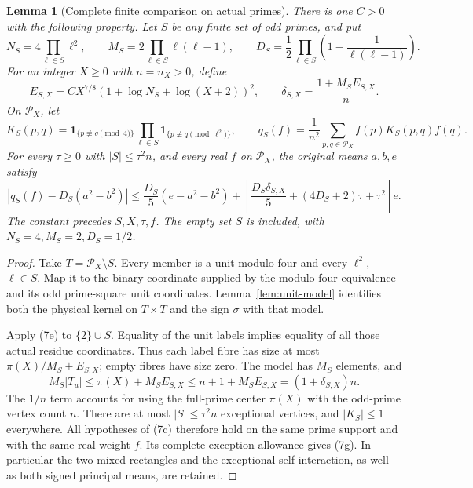 \documentclass[11pt]{article}
\newtheorem{lemma}{Lemma}
\newcommand{\Pcal}{\mathcal P}
\begin{document}
\begin{lemma}[Complete finite comparison on actual primes]\label{lem:prime-finite}
There is one \(C>0\) with the following property.
Let \(S\) be any finite set of odd primes, and put
\[
 N_S=4\prod_{\ell\in S}\ell^2,\qquad
 M_S=2\prod_{\ell\in S}\ell(\ell-1),\qquad
 D_S=\frac12\prod_{\ell\in S}
       \left(1-\frac1{\ell(\ell-1)}\right).
\]
For an integer \(X\ge0\) with \(n=n_X>0\), define
\[
 E_{S,X}=CX^{7/8}(1+\log N_S+\log(X+2))^2,\qquad
 \delta_{S,X}=\frac{1+M_SE_{S,X}}n .
\]
On \(\Pcal_X\), let
\[
 K_S(p,q)=\mathbf1_{\{p\not\equiv q\pmod4\}}
     \prod_{\ell\in S}\mathbf1_{\{p\not\equiv q\pmod{\ell^2}\}},\qquad
 q_S(f)=\frac1{n^2}\sum_{p,q\in\Pcal_X}f(p)K_S(p,q)f(q).
\]
For every \(\tau\ge0\) with \(|S|\le\tau^2n\), and every real
\(f\) on \(\Pcal_X\), the original means \(a,b,e\) satisfy
\[
 |q_S(f)-D_S(a^2-b^2)|
 \le\frac{D_S}{5}(e-a^2-b^2)
  +\left[\frac{D_S\delta_{S,X}}5+
           (4D_S+2)\tau+\tau^2\right]e.                    \tag{7g}
\]
The constant precedes \(S,X,\tau,f\).
The empty set \(S\) is included, with \(N_S=4,M_S=2,D_S=1/2\).
\end{lemma}
\begin{proof}
Take \(T=\Pcal_X\setminus S\).
Every member is a unit modulo four and every \(\ell^2\), \(\ell\in S\).
Map it to the binary coordinate supplied by the modulo-four equivalence
and its odd prime-square unit coordinates.
Lemma~\ref{lem:unit-model} identifies both the physical kernel on
\(T\times T\) and the sign \(\sigma\) with that model.

Apply (7e) to \(\{2\}\cup S\).
Equality of the unit labels implies equality of all those actual residue
coordinates. Thus each label fibre has size at most
\(\pi(X)/M_S+E_{S,X}\); empty fibres have size zero.
The model has \(M_S\) elements, and
\[
 M_S|T_u|\le\pi(X)+M_SE_{S,X}
 \le n+1+M_SE_{S,X}=(1+\delta_{S,X})n .
\]
The \(1/n\) term accounts for using the full-prime center \(\pi(X)\)
with the odd-prime vertex count \(n\).
There are at most \(|S|\le\tau^2n\) exceptional vertices, and
\(|K_S|\le1\) everywhere.
All hypotheses of (7c) therefore hold on the same prime support and with
the same real weight \(f\). Its complete exception allowance gives (7g).
In particular the two mixed rectangles and the exceptional self
interaction, as well as both signed principal means, are retained.
\end{proof}
\end{document}
